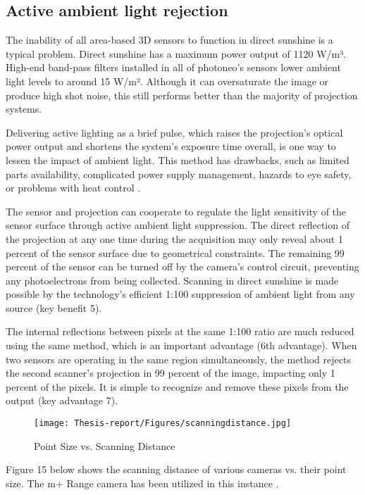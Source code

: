 \documentclass[12pt]{article}
\begin{document}
\subsection{Active ambient light rejection}
The inability of all area-based 3D sensors to function in direct sunshine is a typical problem.  Direct sunshine has a maximum power output of 1120 W/m³. High-end band-pass filters installed in all of photoneo's sensors lower ambient light levels to around 15 W/m².  Although it can oversaturate the image or produce high shot noise, this still performs better than the majority of projection systems.

Delivering active lighting as a brief pulse, which raises the projection's optical power output and shortens the system's exposure time overall, is one way to lessen the impact of ambient light.  This method has drawbacks, such as limited parts availability, complicated power supply management, hazards to eye safety, or problems with heat control \cite {ref15}.

The sensor and projection can cooperate to regulate the light sensitivity of the sensor surface through active ambient light suppression. The direct reflection of the projection at any one time during the acquisition may only reveal about 1 percent of the sensor surface due to geometrical constraints.  The remaining 99 percent of the sensor can be turned off by the camera's control circuit, preventing any photoelectrons from being collected.  Scanning in direct sunshine is made possible by the technology's efficient 1:100 suppression of ambient light from any source (key benefit 5)\cite{ref15}.

The internal reflections between pixels at the same 1:100 ratio are much reduced using the same method, which is an important advantage (6th advantage).   When two sensors are operating in the same region simultaneously, the method rejects the second scanner's projection in 99 percent of the image, impacting only 1 percent of the pixels. It is simple to recognize and remove these pixels from the output (key advantage 7)\cite{ref15}.
 
\begin{figure}[h]
    \centering
    \texttt{[image: Thesis-report/Figures/scanningdistance.jpg]}
    \caption{Point Size vs. Scanning Distance \cite{ref15}}
    \label{fig:scanning-distance}
\end{figure}

Figure 15 below shows the scanning distance of various cameras vs. their point size. The m+ Range camera has been utilized in this instance \cite{ref15}. 
\end{document}
